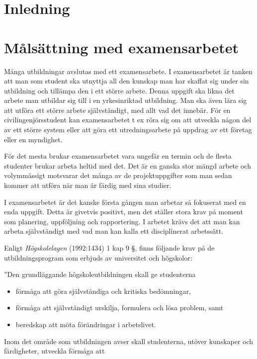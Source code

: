 \section{Inledning}\label{inledning}

\section{Målsättning med
examensarbetet}\label{muxe5lsuxe4ttning-med-examensarbetet}

Många utbildningar avslutas med ett examensarbete. I examensarbetet är
tanken att man som student ska utnyttja all den kunskap man har skaffat
sig under sin utbildning och tillämpa den i ett större arbete. Denna
uppgift ska likna det arbete man utbildar sig till i en yrkesinriktad
utbildning. Man ska även lära sig att utföra ett större arbete
självständigt, med allt vad det innebär. För en civilingenjörsstudent
kan examensarbetet t ex röra sig om att utveckla någon del av ett större
system eller att göra ett utredningsarbete på uppdrag av ett företag
eller en myndighet.

För det mesta brukar examensarbetet vara ungefär en termin och de flesta
studenter brukar arbeta heltid med det. Det är en ganska stor mängd
arbete och volymmässigt motsvarar det många av de projektuppgifter som
man sedan kommer att utföra när man är färdig med sina studier.

I examensarbetet är det kanske första gången man arbetar så fokuserat
med en enda uppgift. Detta är givetvis positivt, men det ställer stora
krav på moment som planering, uppföljning och rapportering. I arbetet
krävs det att man kan arbeta självständigt med vad man kan kalla ett
disciplinerat arbetssätt.

Enligt \emph{Högskolelagen} (1992:1434) 1 kap 9 §, finns följande krav
på de utbildningsprogram som erbjuds av universitet och högskolor:

''Den grundläggande högskoleutbildningen skall ge studenterna

\begin{itemize}
\item
  förmåga att göra självständiga och kritiska bedömningar,
\item
  förmåga att självständigt urskilja, formulera och lösa problem, samt
\item
  beredskap att möta förändringar i arbetslivet.
\end{itemize}

Inom det område som utbildningen avser skall studenterna, utöver
kunskaper och färdigheter, utveckla förmåga att

